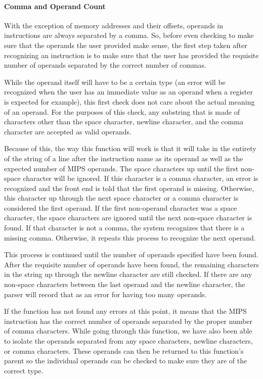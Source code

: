 \documentclass[
    parskip=half,
    fontsize=12pt,
    titlepage=firstiscover,
    toc=bibliography,
    numbers=endperiod
]{scrartcl}
\begin{document}
\paragraph{Comma and Operand Count}
\label{subsec:comma-and-operand-count}

With the exception of memory addresses and their offsets, operands in
instructions are always separated by a comma. So, before even checking
to make sure that the operands the user provided make sense, the first
step taken after recognizing an instruction is to make sure that the
user has provided the requisite number of operands separated by the
correct number of commas.

While the operand itself will have to be a certain type (an error will
be recognized when the user has an immediate value as an operand when a
register is expected for example), this first check does not care about
the actual meaning of an operand. For the purposes of this check, any
substring that is made of characters other than the space character,
newline character, and the comma character are accepted as valid
operands.

Because of this, the way this function will work is that it will take in
the entirety of the string of a line after the instruction name as its
operand as well as the expected number of MIPS operands. The space
characters up until the first non-space character will be ignored. If
this character is a comma character, an error is recognized and the
front end is told that the first operand is missing. Otherwise, this
character up through the next space character or a comma character is
considered the first operand. If the first non-operand character was a
space character, the space characters are ignored until the next
non-space character is found. If that character is not a comma, the
system recognizes that there is a missing comma. Otherwise, it repeats
this process to recognize the next operand.

This process is continued until the number of operands specified have
been found. After the requisite number of operands have been found, the
remaining characters in the string up through the newline character are
still checked. If there are any non-space characters between the last
operand and the newline character, the parser will record that as an
error for having too many operands.

If the function has not found any errors at this point, it means that
the MIPS instruction has the correct number of operands separated by the
proper number of comma characters. While going through this function, we
have also been able to isolate the operands separated from any space
characters, newline characters, or comma characters. These operands can
then be returned to this function's parent so the individual operands
can be checked to make sure they are of the correct type.
\end{document}
